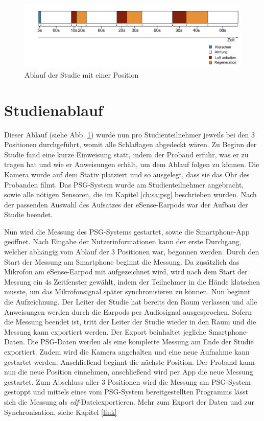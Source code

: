 \begin{figure}[ht]
    \centering
    \includegraphics[width=1\textwidth]{images/study/study_flow2}
    \caption{Ablauf der Studie mit einer Position}
    \label{fig_study_flow}
\end{figure}

\section{Studienablauf}
Dieser Ablauf (siehe Abb. \ref{fig_study_flow}) wurde nun pro Studienteilnehmer jeweils bei den 3 Positionen durchgeführt, womit alle Schlaflagen abgedeckt wären.
Zu Beginn der Studie fand eine kurze Einweisung statt, indem der Proband erfuhr, was er zu tragen hat und wie er Anweisungen erhält, um dem Ablauf folgen zu können. 
Die Kamera wurde auf dem Stativ platziert und so ausgelegt, dass sie das Ohr des Probanden filmt. 
Das PSG-System wurde am Studienteilnehmer angebracht, sowie alle nötigen Sensoren, die im Kapitel \ref{ch:sa:psg} beschrieben wurden.
Nach der passenden Auswahl des Aufsatzes der eSense-Earpods war der Aufbau der Studie beendet.

Nun wird die Messung des PSG-Systems gestartet, sowie die Smartphone-App geöffnet. 
Nach Eingabe der Nutzerinformationen kann der erste Durchgang, welcher abhängig vom Ablauf der 3 Positionen war, begonnen werden.
Durch den Start der Messung am Smartphone beginnt die Messung. 
Da zusätzlich das Mikrofon am eSense-Earpod mit aufgezeichnet wird, wird nach dem Start der Messung ein $4\si{\s}$ Zeitfenster gewählt, indem der Teilnehmer in die Hände klatschen musste, um das Mikrofonsignal später synchronisieren zu können.
Nun beginnt die Aufzeichnung. Der Leiter der Studie hat bereits den Raum verlassen und alle Anweisungen werden durch die Earpods per Audiosignal ausgesprochen. 
Sofern die Messung beendet ist, tritt der Leiter der Studie wieder in den Raum und die Messung kann exportiert werden. 
Der Export beinhaltet jegliche Smartphone-Daten. Die PSG-Daten werden als eine komplette Messung am Ende der Studie exportiert.
Zudem wird die Kamera angehalten und eine neue Aufnahme kann gestartet werden.
Anschließend beginnt die nächste Position. Der Proband kann nun die neue Position einnehmen, anschließend wird per App die neue Messung gestartet.
Zum Abschluss aller 3 Positionen wird die Messung am PSG-System gestoppt und mittels eines vom PSG-System bereitgestellten Programms lässt sich die Messung als \glqq \textit{edf}-Datei\grqq exportieren.
Mehr zum Export der Daten und zur Synchronisation, siehe Kapitel \ref{link} 

